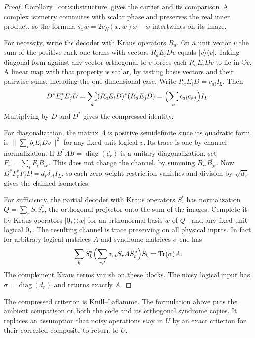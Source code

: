\documentclass[aps,pra,onecolumn,superscriptaddress,nofootinbib,10pt]{revtex4-2}
\theoremstyle{definition}
\theoremstyle{remark}
\begin{document}
\begin{proof}
Corollary~\ref{cor:substructure} gives the carrier and its comparison. A complex isometry commutes with scalar phase and preserves the real inner product, so the formula $s_xw=2c_N(x,w)x-w$ intertwines on its image.

For necessity, write the decoder with Kraus operators $R_a$. On a unit vector $v$ the sum of the positive rank-one terms with vectors $R_a E_i Dv$ equals $|v\rangle\langle v|$. Taking diagonal form against any vector orthogonal to $v$ forces each $R_a E_i Dv$ to lie in $\mathbb C v$. A linear map with that property is scalar, by testing basis vectors and their pairwise sums, including the one-dimensional case. Write $R_a E_iD=c_{ai}I_L$. Then
\[
 D^* E_i^* E_j D=\sum_a (R_a E_iD)^*(R_a E_jD)
              =\Bigl(\sum_a\bar c_{ai}c_{aj}\Bigr)I_L .
\]
Multiplying by $D$ and $D^*$ gives the compressed identity.

For diagonalization, the matrix $\Lambda$ is positive semidefinite since its quadratic form is $\|\sum_i b_iE_iDv\|^2$ for any fixed unit logical $v$. Its trace is one by channel normalization. If $B^*\Lambda B=\operatorname{diag}(d_r)$ is a unitary diagonalization, set $F_r=\sum_i E_i B_{ir}$. This does not change the channel, by summing $B_{ir}\overline{B_{jr}}$. Now $D^*F_r^*F_tD=d_r\delta_{rt}I_L$, so each zero-weight restriction vanishes and division by $\sqrt{d_r}$ gives the claimed isometries.

For sufficiency, the partial decoder with Kraus operators $S_r^*$ has normalization $Q=\sum_r S_r S_r^*$, the orthogonal projector onto the sum of the images. Complete it by Kraus operators $|0_L\rangle\langle w|$ for an orthonormal basis $w$ of $Q^\perp$ and any fixed unit logical $0_L$. The resulting channel is trace preserving on all physical inputs. In fact for arbitrary logical matrices $A$ and syndrome matrices $\sigma$ one has
\[
 \sum_k S_k^*\Bigl(\sum_{r,t}\sigma_{rt}S_r A S_t^*\Bigr)S_k
   =\operatorname{Tr}(\sigma) A.
\]
The complement Kraus terms vanish on these blocks. The noisy logical input has $\sigma=\operatorname{diag}(d_r)$ and returns exactly $A$.
\end{proof}

The compressed criterion is Knill--Laflamme. The formulation above puts the ambient comparison on both the code and its orthogonal syndrome copies. It replaces an assumption that noisy operations stay in $U$ by an exact criterion for their corrected composite to return to $U$. \cite{n4:KL}
\end{document}
